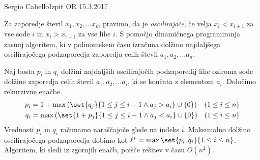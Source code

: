 \begin{naloga}{Sergio Cabello}{Izpit OR 15.3.2017}
\begin{vprasanje}
Za zaporedje števil $x_1, x_2, \dots x_m$ pravimo, da je {\em oscilirajoče},
če velja $x_i < x_{i+1}$ za vse sode $i$ in $x_i > x_{i+1}$ za vse lihe $i$.
S pomočjo dinamičnega programiranja zasnuj algoritem,
ki v polinomskem času izračuna dolžino najdaljšega oscilirajočega podzaporedja
zaporedja celih števil $a_1, a_2, \dots a_n$.
\end{vprasanje}

\begin{odgovor}
Naj bosta $p_i$ in $q_i$ dolžini najdaljših oscilirajočih podzaporedij
lihe oziroma sode dolžine zaporedja celih števil $a_1, a_2, \dots a_i$,
ki se končata z elementom $a_i$.
Določimo rekurzivne enačbe.
\begin{align*}
p_i &= 1 + \max\left(\set{q_j}{1 \le j \le i-1 \land a_j > a_i} \cup \{0\}\right)
&& (1 \le i \le n) \\
q_i &= \max\left(\set{1 + p_j}{1 \le j \le i-1 \land a_j < a_i} \cup \{0\}\right)
&& (1 \le i \le n)
\end{align*}
Vrednosti $p_i$ in $q_i$ računamo naraščajoče glede na indeks $i$.
Maksimalno dolžino oscilirajočega podzaporedja dobimo kot
$\ell^* = \max\set{p_i, q_i}{1 \le i \le n}$.
Algoritem, ki sledi iz zgornjih enačb, poišče rešitev v času $O(n^2)$.


\end{odgovor}
\end{naloga}
